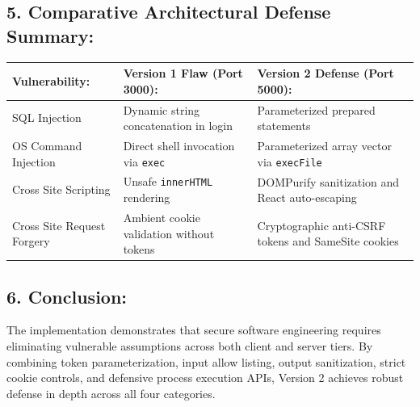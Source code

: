 \documentclass[11pt,a4paper]{article}
\begin{document}
\vspace{12pt}
\subsection*{5. Comparative Architectural Defense Summary:}

\noindent
\begin{tabular}{|p{4.0cm}|p{5.4cm}|p{6.0cm}|}
\hline
\textbf{Vulnerability:} & \textbf{Version 1 Flaw (Port 3000):} & \textbf{Version 2 Defense (Port 5000):} \\
\hline
SQL Injection & Dynamic string concatenation in login & Parameterized prepared statements \\
\hline
OS Command Injection & Direct shell invocation via \texttt{exec} & Parameterized array vector via \texttt{execFile} \\
\hline
Cross Site Scripting & Unsafe \texttt{innerHTML} rendering & DOMPurify sanitization and React auto-escaping \\
\hline
Cross Site Request Forgery & Ambient cookie validation without tokens & Cryptographic anti-CSRF tokens and SameSite cookies \\
\hline
\end{tabular}

\vspace{12pt}
\subsection*{6. Conclusion:}
The implementation demonstrates that secure software engineering requires eliminating vulnerable assumptions across both client and server tiers. By combining token parameterization, input allow listing, output sanitization, strict cookie controls, and defensive process execution APIs, Version 2 achieves robust defense in depth across all four categories.
\end{document}

